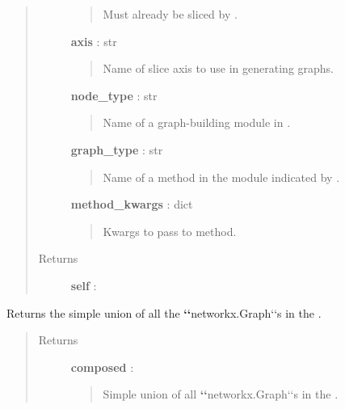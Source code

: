 \documentclass[letterpaper,10pt,english]{sphinxmanual}
\begin{document}
\begin{fulllineitems}
\begin{fulllineitems}
\begin{quote}
\begin{description}
\begin{quote}
Must already be sliced by .
\end{quote}

\textbf{axis} : str
\begin{quote}

Name of slice axis to use in generating graphs.
\end{quote}

\textbf{node\_type} : str
\begin{quote}

Name of a graph-building module in {\hyperref[tethne.networks:module-tethne.networks]{}}.
\end{quote}

\textbf{graph\_type} : str
\begin{quote}

Name of a method in the module indicated by .
\end{quote}

\textbf{method\_kwargs} : dict
\begin{quote}

Kwargs to pass to  method.
\end{quote}

\item[{Returns}] \leavevmode
\textbf{self} : {\hyperref[tethne.classes.graphcollection:tethne.classes.graphcollection.GraphCollection]{}}

\end{description}\end{quote}

\end{fulllineitems}


\begin{fulllineitems}
\label{tethne.classes.graphcollection:tethne.classes.graphcollection.GraphCollection.compose}
Returns the simple union of all the {\color{red}\bfseries{}{}`{}`}networkx.Graph{}`{}`s in the
{\hyperref[tethne.classes.graphcollection:tethne.classes.graphcollection.GraphCollection]{}}.
\begin{quote}\begin{description}
\item[{Returns}] \leavevmode
\textbf{composed} : 
\begin{quote}

Simple union of all {\color{red}\bfseries{}{}`{}`}networkx.Graph{}`{}`s in the
{\hyperref[tethne.classes.graphcollection:tethne.classes.graphcollection.GraphCollection]{}}.
\end{quote}


\end{description}
\end{quote}
\end{fulllineitems}
\end{fulllineitems}
\end{document}
